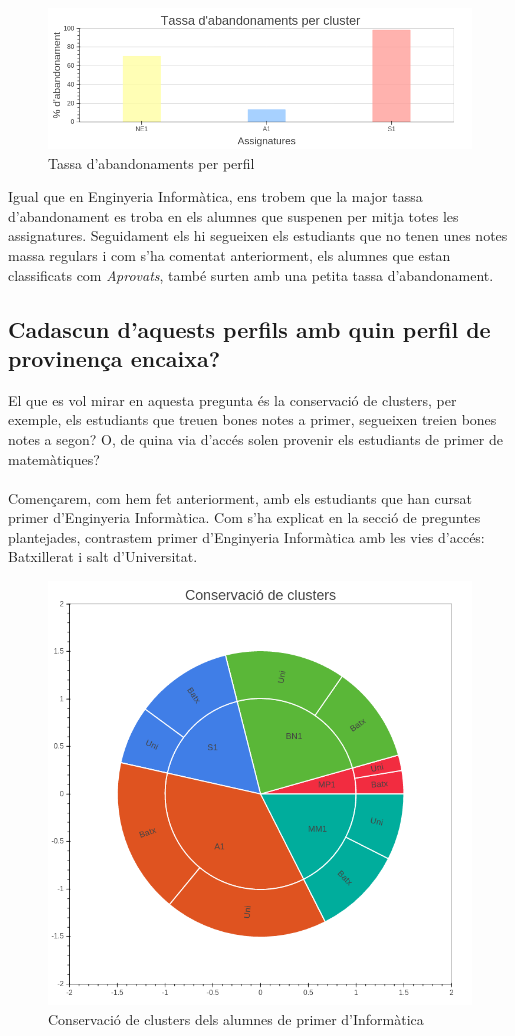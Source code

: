 \documentclass[12pt,a4paper,catalan]{article}
\begin{document}
\begin{figure}[h]
\centering
\includegraphics[width=\linewidth]{img/abandonaments_primer_mates.png}
\caption{Tassa d'abandonaments per perfil}
\end{figure}

Igual que en Enginyeria Informàtica, ens trobem que la major tassa d'abandonament es troba en els alumnes que suspenen per mitja totes les assignatures. Seguidament els hi segueixen els estudiants que no tenen unes notes massa regulars i com s'ha comentat anteriorment, els alumnes que estan classificats com \textit{Aprovats}, també surten amb una petita tassa d'abandonament.

\newpage

\subsection{Cadascun d'aquests perfils amb quin perfil de provinença encaixa?}
El que es vol mirar en aquesta pregunta és la conservació de clusters, per exemple, els estudiants que treuen bones notes a primer, segueixen treien bones notes a segon? O, de quina via d'accés solen provenir els estudiants de primer de matemàtiques? 
\\
\\
Començarem, com hem fet anteriorment, amb els estudiants que han cursat primer d'Enginyeria Informàtica. Com s'ha explicat en la secció de preguntes plantejades, contrastem primer d'Enginyeria Informàtica amb les vies d'accés: Batxillerat i salt d'Universitat.

\begin{figure}[h]
\centering
\includegraphics[width=.6\linewidth]{img/conservacio_clusters_primer_info.png}
\caption{Conservació de clusters dels alumnes de primer d'Informàtica}
\end{figure}
\end{document}
